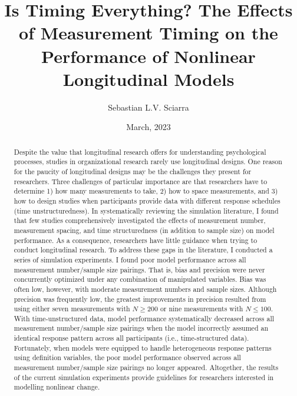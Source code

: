 \documentclass[
12pt, %
twoside,
english]{guelphthesis}
\title{Is Timing Everything? The Effects of Measurement Timing on the Performance of Nonlinear Longitudinal Models}
\author{Sebastian L.V. Sciarra}
\date{March, 2023}
\let\cleardoublepage\clearpage
\let\oldfrontmatter\frontmatter
\renewcommand{\frontmatter}{
  \oldfrontmatter
  
  
   \pagestyle{frontmatter} %
}
\begin{document}
\frontmatter %

  \maketitle

\setcounter{page}{2} %

\cleardoublepage
\thispagestyle{empty} %
  \begin{abstract}{2}{Despite the value that longitudinal research offers for understanding psychological processes, studies in organizational research rarely use longitudinal designs. One reason for the paucity of longitudinal designs may be the challenges they present for researchers. Three challenges of particular importance are that researchers have to determine 1) how many measurements to take, 2) how to space measurements, and 3) how to design studies when participants provide data with different response schedules (time unstructuredness). In systematically reviewing the simulation literature, I found that few studies comprehensively investigated the effects of measurement number, measurement spacing, and time structuredness (in addition to sample size) on model performance. As a consequence, researchers have little guidance when trying to conduct longitudinal research. To address these gaps in the literature, I conducted a series of simulation experiments. I found poor model performance across all measurement number/sample size pairings. That is, bias and precision were never concurrently optimized under any combination of manipulated variables. Bias was often low, however, with moderate measurement numbers and sample sizes. Although precision was frequently low, the greatest improvements in precision resulted from using either seven measurements with \(N \ge 200\) or nine measurements with \(N \le 100\). With time-unstructured data, model performance systematically decreased across all measurement number/sample size pairings when the model incorrectly assumed an identical response pattern across all participants (i.e., time-structured data). Fortunately, when models were equipped to handle heterogeneous response patterns using definition variables, the poor model performance observed across all measurement number/sample size pairings no longer appeared. Altogether, the results of the current simulation experiments provide guidelines for researchers interested in modelling nonlinear change.}  %

  \end{abstract}
\end{document}
